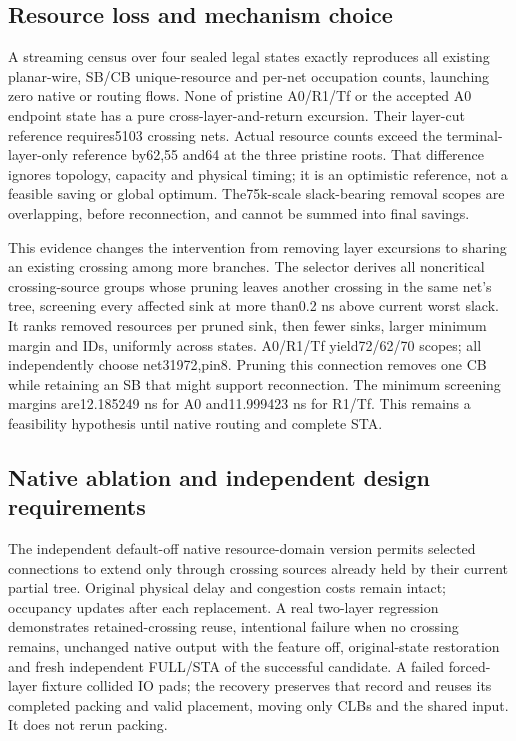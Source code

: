 \subsection{Resource loss and mechanism choice}
A streaming census over four sealed legal states exactly reproduces all existing planar-wire, SB/CB unique-resource and per-net occupation counts, launching zero native or routing flows. None of pristine A0/R1/Tf or the accepted A0 endpoint state has a pure cross-layer-and-return excursion. Their layer-cut reference requires5103 crossing nets. Actual resource counts exceed the terminal-layer-only reference by62,55 and64 at the three pristine roots. That difference ignores topology, capacity and physical timing; it is an optimistic reference, not a feasible saving or global optimum. The75k-scale slack-bearing removal scopes are overlapping, before reconnection, and cannot be summed into final savings.

This evidence changes the intervention from removing layer excursions to sharing an existing crossing among more branches. The selector derives all noncritical crossing-source groups whose pruning leaves another crossing in the same net's tree, screening every affected sink at more than0.2 ns above current worst slack. It ranks removed resources per pruned sink, then fewer sinks, larger minimum margin and IDs, uniformly across states. A0/R1/Tf yield72/62/70 scopes; all independently choose net31972,pin8. Pruning this connection removes one CB while retaining an SB that might support reconnection. The minimum screening margins are12.185249 ns for A0 and11.999423 ns for R1/Tf. This remains a feasibility hypothesis until native routing and complete STA.

\subsection{Native ablation and independent design requirements}
The independent default-off native resource-domain version permits selected connections to extend only through crossing sources already held by their current partial tree. Original physical delay and congestion costs remain intact; occupancy updates after each replacement. A real two-layer regression demonstrates retained-crossing reuse, intentional failure when no crossing remains, unchanged native output with the feature off, original-state restoration and fresh independent FULL/STA of the successful candidate. A failed forced-layer fixture collided IO pads; the recovery preserves that record and reuses its completed packing and valid placement, moving only CLBs and the shared input. It does not rerun packing.

